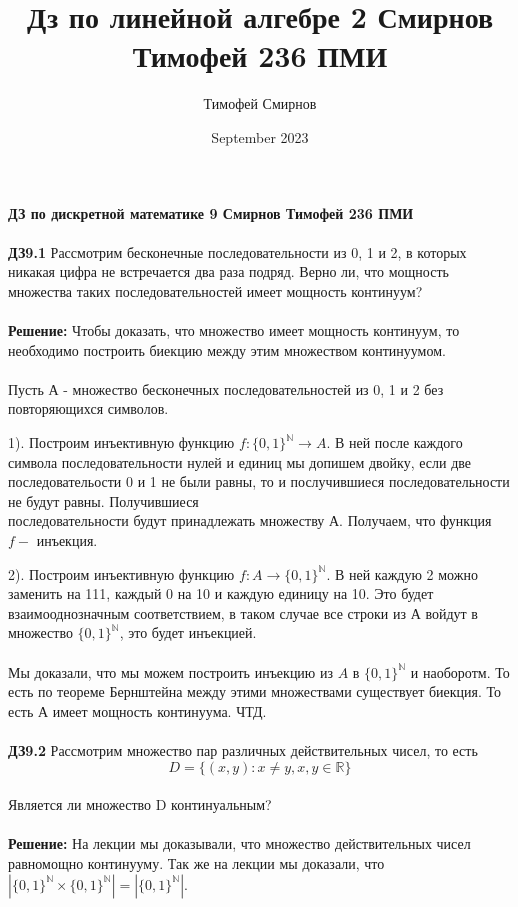 \documentclass[a4paper, 12pt]{article}
\title{Дз по линейной алгебре 2 Смирнов Тимофей 236 ПМИ}
\author{Тимофей Смирнов}
\date{September 2023}
\begin{document}
    {\center \bf \large ДЗ по дискретной математике 9 Смирнов Тимофей 236 ПМИ}
    \\
    \\ \textbf{ДЗ9.1} Рассмотрим бесконечные последовательности из 0, 1 и 2, в которых никакая цифра не встречается два раза подряд. Верно ли, что мощность множества таких последовательностей имеет мощность континуум?
    \\
    \\ \textbf{Решение: } Чтобы доказать, что множество имеет мощность континуум, то необходимо построить биекцию между этим множеством континуумом.
    \\
    \\ Пусть А - множество бесконечных последовательностей из 0, 1 и 2 без повторяющихся символов. 
    \\
    \par 1). Построим инъективную функцию $f: \{0, 1\}^{\mathbb{N}} \to A$. В ней после каждого символа последовательности нулей и единиц мы допишем двойку, если две последовательости 0 и 1 не были равны, то и послучившиеся последовательности не будут равны. Получившиеся \\ последовательности будут принадлежать множеству А. Получаем, что функция $f - $ инъекция.
    \\
    \par 2). Построим инъективную функцию $f: A \to \{0, 1\}^{\mathbb{N}}$. В ней каждую 2 можно заменить на 111, каждый 0 на 10 и каждую единицу на 10. Это будет взаимооднозначным соответствием, в таком случае все строки из А войдут в множество $\{0, 1\}^{\mathbb{N}}$, это будет инъекцией.
    \\
    \\ Мы доказали, что мы можем построить инъекцию из $A$ в $\{0, 1\}^{\mathbb{N}}$ и наоборотм. То есть по теореме Бернштейна между этими множествами существует биекция. То есть А имеет мощность континуума. ЧТД.
    \\
    \\ \textbf{ДЗ9.2} Рассмотрим множество пар различных действительных чисел, то есть 
    \\ \[D = \{(x, y): x \neq y, x,y \in \mathbb{R} \}\]
    \\ Является ли множество D континуальным?
    \\
    \\ \textbf{Решение: } На лекции мы доказывали, что множество действительных чисел равномощно континууму. Так же на лекции мы доказали, что $|\{0, 1\}^{\mathbb{N}} \times \{0, 1\}^{\mathbb{N}}| = |\{0, 1\}^{\mathbb{N}}|$. 
\end{document}

